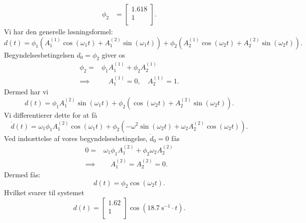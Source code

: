 \begin{derivation}
\begin{align*}
        \phi_2 &= \begin{bmatrix}
        \num{1,618} \\
        1\\
        \end{bmatrix}
    .\end{align*}
    Vi har den generelle løsningsformel:
    \[ 
    d(t) = \phi_1 \left( A_1^{(1)} \cos \left( \omega_1 t \right) + A_1^{(2)} \sin \left( \omega_1 t \right) \right) + \phi_2 \left( A_2^{(1)} \cos \left( \omega_2 t \right) + A_2^{(2)} \sin \left( \omega_2 t \right) \right)
    .\]
    Begyndelsesbetingelsen $d_0 = \phi_2$ giver os
    \begin{align*}
      \phi_2 =& \phi_1 A_1^{(1)} + \phi_2 A_2^{(1)} \\
      \implies& \quad A_1^{(1)} = 0, \quad A_2^{(1)} = 1
    .\end{align*}
    Dermed har vi
    \[ 
    d(t) = \phi_1 A_1^{(2)} \sin \left( \omega_1 t \right) + \phi_2 \left( \cos \left( \omega_2 t \right) + A_2^{(2)} \sin \left( \omega_2 t \right) \right)
    .\]
    Vi differentierer dette for at få
    \[ 
    \dot{d} (t) = \omega_1 \phi_1 A_1^{(2)} \cos \left( \omega_1 t \right) + \phi_2 \left( - \omega^2 \sin \left( \omega_2 t \right) + \omega_2 A_2^{(2)} \cos \left( \omega_2 t \right) \right)
    .\]
    Ved indsættelse af vores begyndelsesbetingelse, $\dot{d}_0 = 0$ fås
    \begin{align*}
      0 =& \omega_1 \phi_1 A_1^{(2)} + \phi_2 \omega_2 A_2^{(2)} \\
      \implies& \quad A_1^{(2)} = A_2^{(2)} = 0
    .\end{align*}
    Dermed fås:
    \[ 
    d(t) = \phi_2 \cos \left( \omega_2 t \right)
    .\]
    Hvilket svarer til systemet
    \[
      d(t) = \begin{bmatrix}
      \num{1,62}\\
      1\\
      \end{bmatrix} \cos \left( \qty{18,7}{\s^{-1}} \cdot t \right)
    .\]
  \end{derivation}


